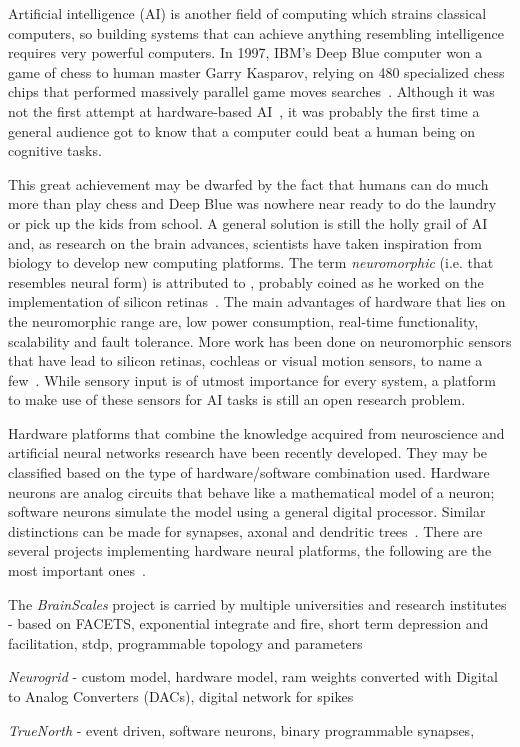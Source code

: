 Artificial intelligence (AI) is another field of computing which strains classical computers, so building systems that can achieve anything resembling intelligence requires very powerful computers. In 1997, IBM's Deep Blue computer won a game of chess to human master Garry Kasparov, relying on 480 specialized chess chips that performed massively parallel game moves searches~\cite{deep-blue-Campbell200257}. Although it was not the first attempt at hardware-based AI~\cite{indiveri2011frontiers}, it was probably the first time a general audience got to know that a computer could beat a human being on cognitive tasks. 

This great achievement may be dwarfed by the fact that humans can do much more than play chess and Deep Blue was nowhere near ready to do the laundry or pick up the kids from school. A general solution is still the holly grail of AI and, as research on the brain advances, scientists have taken inspiration from biology to develop new computing platforms. 
The term \emph{neuromorphic} (i.e. that resembles neural form) is attributed to \citeauthor{mead2012analog}, probably coined as he worked on the implementation of silicon retinas~\cite{carver-mead,mead2012analog}. The main advantages of hardware that lies on the neuromorphic range are, low power consumption, real-time functionality, scalability and fault tolerance. More work has been done on neuromorphic sensors that have lead to silicon retinas, cochleas or visual motion sensors, to name a few~\cite{liu2010neuromorphic}. While sensory input is of utmost importance for every system, a platform to make use of these sensors for AI tasks is still an open research problem. 

Hardware platforms that combine the knowledge acquired from neuroscience and artificial neural networks research have been recently developed. They may be classified based on the type of hardware/software combination used. Hardware neurons are analog circuits that behave like a mathematical model of a neuron; software neurons simulate the model using a general digital processor. Similar distinctions can be made for synapses, axonal and dendritic trees~\cite{misra2010artificial}. There are several projects implementing hardware neural platforms, the following are the most important ones~\cite{neuro-platforms-summary-7159144}.

The \emph{BrainScales} project is carried by multiple universities and research institutes - based on FACETS, exponential integrate and fire, short term depression and facilitation, stdp, programmable topology and parameters

\emph{Neurogrid} - custom model, hardware model, ram weights converted with Digital to Analog Converters (DACs), digital network for spikes

\emph{TrueNorth} - event driven, software neurons, binary programmable synapses, 